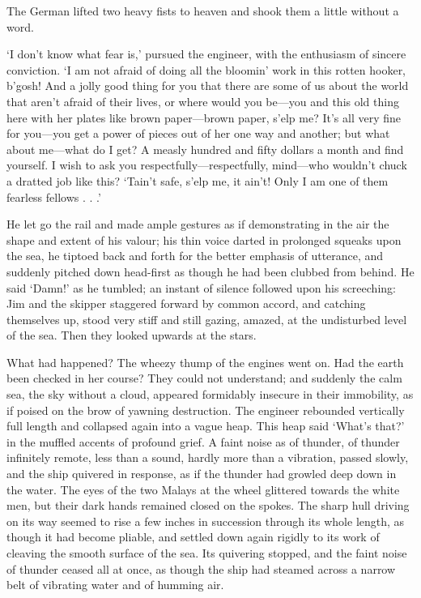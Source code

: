 The German lifted two heavy fists to heaven and shook them a little without a word.

‘I don’t know what fear is,’ pursued the engineer, with the enthusiasm of sincere conviction. ‘I am not afraid of doing all the bloomin’ work in this rotten hooker, b’gosh! And a jolly good thing for you that there are some of us about the world that aren’t afraid of their lives, or where would you be—you and this old thing here with her plates like brown paper—brown paper, s’elp me? It’s all very fine for you—you get a power of pieces out of her one way and another; but what about me—what do I get? A measly hundred and fifty dollars a month and find yourself. I wish to ask you respectfully—respectfully, mind—who wouldn’t chuck a dratted job like this? ‘Tain’t safe, s’elp me, it ain’t! Only I am one of them fearless fellows . . .’

He let go the rail and made ample gestures as if demonstrating in the air the shape and extent of his valour; his thin voice darted in prolonged squeaks upon the sea, he tiptoed back and forth for the better emphasis of utterance, and suddenly pitched down head-first as though he had been clubbed from behind. He said ‘Damn!’ as he tumbled; an instant of silence followed upon his screeching: Jim and the skipper staggered forward by common accord, and catching themselves up, stood very stiff and still gazing, amazed, at the undisturbed level of the sea. Then they looked upwards at the stars.

What had happened? The wheezy thump of the engines went on. Had the earth been checked in her course? They could not understand; and suddenly the calm sea, the sky without a cloud, appeared formidably insecure in their immobility, as if poised on the brow of yawning destruction. The engineer rebounded vertically full length and collapsed again into a vague heap. This heap said ‘What’s that?’ in the muffled accents of profound grief. A faint noise as of thunder, of thunder infinitely remote, less than a sound, hardly more than a vibration, passed slowly, and the ship quivered in response, as if the thunder had growled deep down in the water. The eyes of the two Malays at the wheel glittered towards the white men, but their dark hands remained closed on the spokes. The sharp hull driving on its way seemed to rise a few inches in succession through its whole length, as though it had become pliable, and settled down again rigidly to its work of cleaving the smooth surface of the sea. Its quivering stopped, and the faint noise of thunder ceased all at once, as though the ship had steamed across a narrow belt of vibrating water and of humming air. 